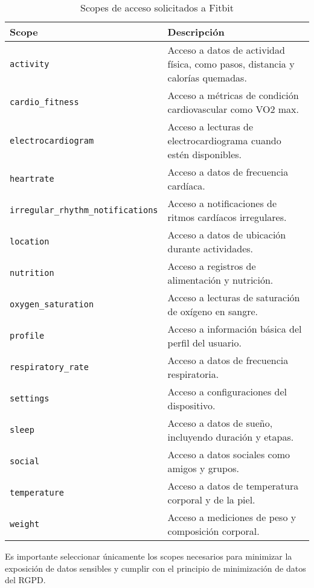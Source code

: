 \begin{table}[H]
    \centering
    \caption{Scopes de acceso solicitados a Fitbit\textsuperscript{\textregistered}}
    \label{tab:fitbit_scopes}
    \begin{tabular}{|l|p{10cm}|}
    \hline
    \textbf{Scope} & \textbf{Descripción} \\
    \hline
    \texttt{activity} & Acceso a datos de actividad física, como pasos, distancia y calorías quemadas. \\
    \hline
    \texttt{cardio\_fitness} & Acceso a métricas de condición cardiovascular como VO2 max. \\
    \hline
    \texttt{electrocardiogram} & Acceso a lecturas de electrocardiograma cuando estén disponibles. \\
    \hline
    \texttt{heartrate} & Acceso a datos de frecuencia cardíaca. \\
    \hline
    \texttt{irregular\_rhythm\_notifications} & Acceso a notificaciones de ritmos cardíacos irregulares. \\
    \hline
    \texttt{location} & Acceso a datos de ubicación durante actividades. \\
    \hline
    \texttt{nutrition} & Acceso a registros de alimentación y nutrición. \\
    \hline
    \texttt{oxygen\_saturation} & Acceso a lecturas de saturación de oxígeno en sangre. \\
    \hline
    \texttt{profile} & Acceso a información básica del perfil del usuario. \\
    \hline
    \texttt{respiratory\_rate} & Acceso a datos de frecuencia respiratoria. \\
    \hline
    \texttt{settings} & Acceso a configuraciones del dispositivo. \\
    \hline
    \texttt{sleep} & Acceso a datos de sueño, incluyendo duración y etapas. \\
    \hline
    \texttt{social} & Acceso a datos sociales como amigos y grupos. \\
    \hline
    \texttt{temperature} & Acceso a datos de temperatura corporal y de la piel. \\
    \hline
    \texttt{weight} & Acceso a mediciones de peso y composición corporal. \\
    \hline
    \end{tabular}
    \end{table}

Es importante seleccionar únicamente los scopes necesarios para minimizar la exposición de datos sensibles y cumplir con el principio de minimización de datos del RGPD.


